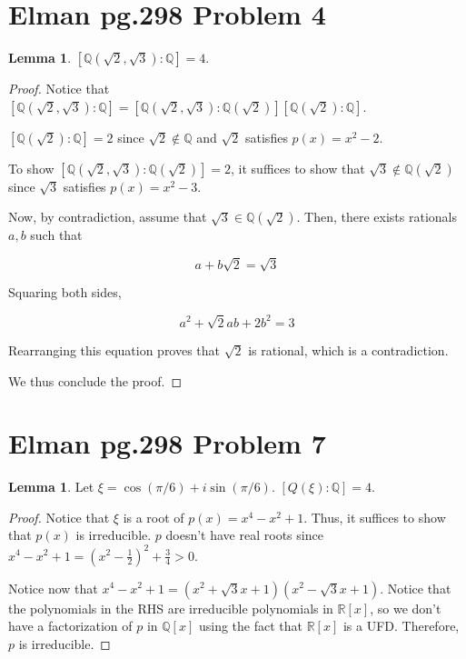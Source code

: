 \documentclass{article}
\theoremstyle{definition}
\newtheorem{lemma}[theorem]{Lemma}
\newcommand{\R}{\mathbb{R}}
\newcommand{\Q}{\mathbb{Q}}
\begin{document}
\section{Elman pg.298 Problem 4}

\begin{lemma}
    $[\Q(\sqrt{2},\sqrt{3}) : \Q] = 4$.
\end{lemma}
\begin{proof}
    Notice that $[\Q(\sqrt{2},\sqrt{3}) : \Q] = [\Q(\sqrt{2},\sqrt{3}) : \Q(\sqrt{2})][\Q(\sqrt{2}) : \Q]$.
    
    $[\Q(\sqrt{2}) : \Q] = 2$ since $\sqrt{2} \notin \Q$ and $\sqrt{2}$ satisfies $p(x) = x^{2} - 2$.

    To show $[\Q(\sqrt{2},\sqrt{3}) : \Q(\sqrt{2})] = 2$, it suffices to show that $\sqrt{3} \notin \Q(\sqrt{2})$
    since $\sqrt{3}$ satisfies $p(x) = x^{2} - 3$.

    Now, by contradiction, assume that $\sqrt{3} \in \Q(\sqrt{2})$. Then, there exists rationals $a,b$ such that

    \[ a + b \sqrt{2} = \sqrt{3} \]

    Squaring both sides,

    \[ a^{2} + \sqrt{2}ab + 2b^{2} = 3\]

    Rearranging this equation proves that $\sqrt{2}$ is rational, which is a contradiction.

    We thus conclude the proof.
\end{proof}

\newpage

\section{Elman pg.298 Problem 7}

\begin{lemma}
    Let $\xi = \cos(\pi/6) + i \sin(\pi/6)$. $[Q(\xi):\Q] = 4$.
\end{lemma}
\begin{proof}
    Notice that $\xi$ is a root of $p(x) = x^{4} - x^{2} + 1$. Thus, it suffices to show that
    $p(x)$ is irreducible. $p$ doesn't have real roots since $x^{4} - x^{2} + 1 = (x^{2} - \frac{1}{2})^{2} + \frac{3}{4} > 0$. 
    
    Notice now that $x^{4} - x^{2} + 1 = (x^{2} + \sqrt{3}x + 1)(x^{2} - \sqrt{3}x + 1)$. Notice that the polynomials in the 
    RHS are irreducible polynomials 
    in $\R[x]$, so we don't have a factorization of $p$ in $\Q[x]$ using the fact that $\R[x]$ is a UFD. Therefore, $p$
    is irreducible.
\end{proof}
\end{document}

